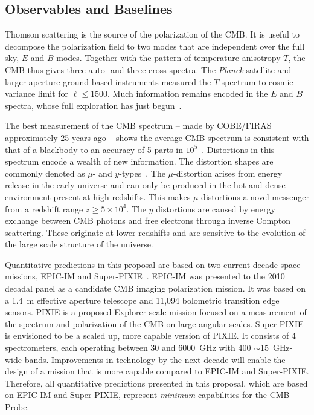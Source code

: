 
\subsection{Observables and Baselines}
\label{sec:observables}

\vspace{-0.05in}

Thomson scattering is the source of the polarization of the \ac{CMB}. It is useful 
to decompose the polarization field to two modes that are independent over the full sky, $E$ and $B$ modes. 
Together with the pattern of temperature anisotropy $T$, the \ac{CMB} thus gives three auto- and three cross-spectra. 
The {\it Planck} satellite and larger aperture ground-based instruments measured the $T$ spectrum to cosmic
variance limit for $\ell \leq 1500$. Much information remains encoded in the $E$ and $B$ spectra, whose full exploration 
has just begun~\cite{planck2015parameters, Hanson2013,PB_BB,bicep2Bmode, bkp2015}.  

The best measurement of the \ac{CMB} spectrum -- made by COBE/FIRAS approximately 25 years ago --
shows the average CMB spectrum is consistent with that of a blackbody to an accuracy of 5 parts 
in $10^{5}$~\cite{Mather1994, Fixsen1996}. Distortions in this spectrum encode a wealth of new information.
The distortion shapes are commonly denoted as $\mu$- and $y$-types~\cite{Zeldovich1969, Sunyaev1970mu}. The 
$\mu$-distortion arises from energy release in the early universe and can only be produced in the hot and dense 
environment present at high redshifts. This makes $\mu$-distortions a novel messenger from a redshift 
range $ z \geq 5\times10^{4} $. The $y$ distortions are caused by 
energy exchange between \ac{CMB} photons and free electrons through inverse Compton 
scattering. These originate at lower redshifts and are sensitive to the 
evolution of the large scale structure of the universe. 

Quantitative predictions in this proposal are based on two current-decade space missions, 
EPIC-IM and Super-PIXIE~\cite{bock2009, Kogut2011PIXIE}. EPIC-IM was presented 
to the 2010 decadal panel as a candidate \ac{CMB} imaging polarization mission. 
It was based on a 1.4~m effective aperture telescope and 11,094 bolometric transition edge sensors. 
PIXIE is a proposed Explorer-scale mission focused on a measurement of the spectrum 
and polarization of the CMB on large angular scales. Super-PIXIE is envisioned to be a scaled up, 
more capable version of PIXIE. It consists of 4 spectrometers, each operating between 
30 and 6000~GHz with 400 $\sim$15~GHz-wide bands. Improvements in technology by the next decade will enable 
the design of a mission that is more capable compared to EPIC-IM and Super-PIXIE. Therefore, all 
quantitative predictions presented in this proposal, which are based on EPIC-IM and Super-PIXIE, 
represent {\it minimum} capabilities for the CMB Probe. 



